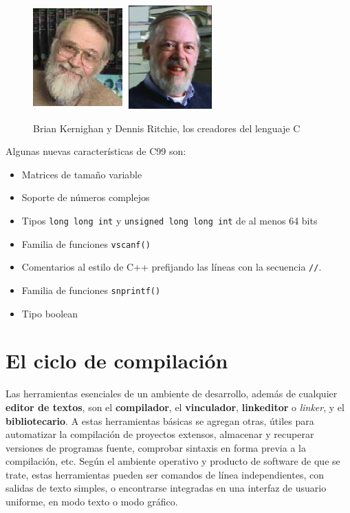  \begin{figure}[htbp] 
 \centering 
 \includegraphics[width=3.44cm,height=3.969cm]{./img/kernighan.jpg} 
 \includegraphics[width=3.44cm,height=3.969cm]{./img/dennis_ritchie.jpg} 
 \caption{Brian Kernighan y Dennis Ritchie, los creadores del lenguaje C} 
 \label{fig:kandr} 
 \end{figure} 


Algunas nuevas características de C99 son: 

\begin{itemize}
\item Matrices de tamaño variable 
\item Soporte de números complejos 
\item Tipos \texttt{long long int} y \texttt{unsigned long long int} de al menos 64 bits 
\item Familia de funciones \texttt{vscanf()} 
\item Comentarios al estilo de C++ prefijando las líneas con la secuencia \texttt{//}. 
\item Familia de funciones \texttt{snprintf()} 
\item Tipo boolean
\end{itemize}


\section{El ciclo de compilación}
Las herramientas esenciales de un ambiente de desarrollo, además de
cualquier \textbf{editor de textos}, son el \textbf{compilador}, el \textbf{vinculador}, 
\textbf{linkeditor} o \textit{linker}, y el \textbf{bibliotecario}. A
estas herramientas básicas se agregan otras, útiles para
automatizar la compilación de proyectos extensos, almacenar y
recuperar versiones de programas fuente, comprobar sintaxis en forma
previa a la compilación, etc. Según el ambiente operativo y
producto de software de que se trate, estas herramientas pueden ser comandos de línea independientes, con
salidas de texto simples, o encontrarse integradas en una interfaz de usuario uniforme, en modo
texto o modo gráfico. 

